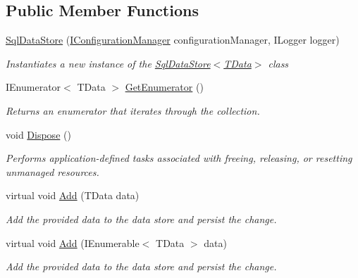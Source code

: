 \subsection*{Public Member Functions}
\begin{DoxyCompactItemize}
\item 
\hyperlink{classCqrs_1_1DataStores_1_1SqlDataStore_a0ce9b3f74799e463d4f53eda386d5577_a0ce9b3f74799e463d4f53eda386d5577}{Sql\+Data\+Store} (\hyperlink{interfaceCqrs_1_1Configuration_1_1IConfigurationManager}{I\+Configuration\+Manager} configuration\+Manager, I\+Logger logger)
\begin{DoxyCompactList}\small\item\em Instantiates a new instance of the \hyperlink{classCqrs_1_1DataStores_1_1SqlDataStore_a0ce9b3f74799e463d4f53eda386d5577_a0ce9b3f74799e463d4f53eda386d5577}{Sql\+Data\+Store$<$\+T\+Data$>$} class \end{DoxyCompactList}\item 
I\+Enumerator$<$ T\+Data $>$ \hyperlink{classCqrs_1_1DataStores_1_1SqlDataStore_a774a0a12d6a89479cf25191916f51c47_a774a0a12d6a89479cf25191916f51c47}{Get\+Enumerator} ()
\begin{DoxyCompactList}\small\item\em Returns an enumerator that iterates through the collection. \end{DoxyCompactList}\item 
void \hyperlink{classCqrs_1_1DataStores_1_1SqlDataStore_a975c0087677987dffccc4f0ffa97e691_a975c0087677987dffccc4f0ffa97e691}{Dispose} ()
\begin{DoxyCompactList}\small\item\em Performs application-\/defined tasks associated with freeing, releasing, or resetting unmanaged resources. \end{DoxyCompactList}\item 
virtual void \hyperlink{classCqrs_1_1DataStores_1_1SqlDataStore_abcca53d2e93dbdfb193a9fb0996849c5_abcca53d2e93dbdfb193a9fb0996849c5}{Add} (T\+Data data)
\begin{DoxyCompactList}\small\item\em Add the provided {\itshape data}  to the data store and persist the change. \end{DoxyCompactList}\item 
virtual void \hyperlink{classCqrs_1_1DataStores_1_1SqlDataStore_a45aa105f2571510223c6073804690487_a45aa105f2571510223c6073804690487}{Add} (I\+Enumerable$<$ T\+Data $>$ data)
\begin{DoxyCompactList}\small\item\em Add the provided {\itshape data}  to the data store and persist the change. \end{DoxyCompactList}\item 

\end{DoxyCompactItemize}
